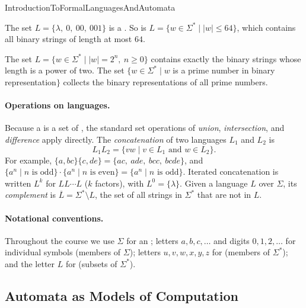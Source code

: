\documentclass[hidelinks]{article}
\begin{document}
\begin{smodule}[title={Introduction to Formal Languages and Automata}]{IntroductionToFormalLanguagesAndAutomata}
\begin{example}[Finite languages over $\Sigma = \{0,1\}$]
The set $L = \{\lambda,\ 0,\ 00,\ 001\}$ is a . So is $L = \{w \in \Sigma^* \mid |w| \leq 64\}$, which contains all binary strings of length at most $64$.
\end{example}

\begin{example}[Infinite languages over $\Sigma = \{0,1\}$]
The set $L = \{w \in \Sigma^* \mid |w| = 2^n,\ n \geq 0\}$ contains exactly the binary strings whose length is a power of two. The set $\{w \in \Sigma^* \mid w$ is a prime number in binary representation$\}$ collects the binary representations of all prime numbers.
\end{example}

\paragraph{Operations on languages.}
Because a  is a set of , the standard set operations of \emph{union}, \emph{intersection}, and \emph{difference} apply directly. The \emph{concatenation} of two languages $L_1$ and $L_2$ is
\[
L_1 L_2 = \{ vw \mid v \in L_1 \text{ and } w \in L_2 \}.
\]
For example, $\{a, bc\} \{c, de\} = \{ac,\ ade,\ bcc,\ bcde\}$, and $\{a^n \mid n \text{ is odd}\} \cdot \{a^n \mid n \text{ is even}\} = \{a^n \mid n \text{ is odd}\}$. Iterated concatenation is written $L^k$ for $L L \cdots L$ ($k$ factors), with $L^0 = \{\lambda\}$. Given a language $L$ over $\Sigma$, its \emph{complement} is $\overline{L} = \Sigma^* \setminus L$, the set of all strings in $\Sigma^*$ that are not in $L$.

\paragraph{Notational conventions.}
Throughout the course we use $\Sigma$ for an ; letters $a, b, c, \ldots$ and digits $0, 1, 2, \ldots$ for individual symbols (members of $\Sigma$); letters $u, v, w, x, y, z$ for  (members of $\Sigma^*$); and the letter $L$ for  (subsets of $\Sigma^*$).

\subsection{Automata as Models of Computation}


\end{smodule}
\end{document}
